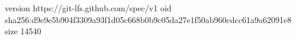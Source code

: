version https://git-lfs.github.com/spec/v1
oid sha256:d9e9e5b904f3309a93f1d05c668b0b9c05da27e1f50ab960cdcc61a9a62091e8
size 14540
